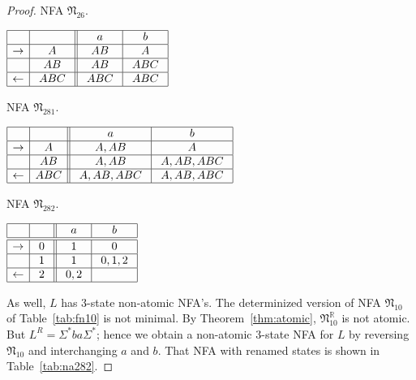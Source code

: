 \documentclass{llncs}
\newcommand{\Sig}{\Sigma}
\newcommand{\fN}{{\mathfrak N}}
\newcommand{\rev}{\mathbb{R}}
\begin{document}
\begin{example}
\begin{proof}
\begin{table}[h]
\begin{minipage}[b]{0.45\linewidth}
\caption{NFA $\fN_{26}$.}
\label{tab:fn26}
\begin{center}
$
\begin{array}{|c| c||c| c| }    
\hline
& \ \  \ \ 
&\ \ a \ \ &\ \ b \ \ \\
\hline  
\rightarrow &A
& \ AB \ & \ A \ \\
\hline  
 & AB
&  AB  & \  ABC \ \\
\hline  
\leftarrow & \ ABC \
 & \ ABC \ & \ ABC \ \\
\hline  
\end{array}
$
\end{center}
\end{minipage}
\hspace{0.2cm}
\begin{minipage}[b]{0.45\linewidth}
\caption{NFA $\fN_{281}$.}
\label{tab:fn281}
\begin{center}
$
\begin{array}{|c| c||c| c| c|c|}    
\hline
& \ \  \ \ 
&\ \ a \ \ &\ \ b \ \   \\
\hline  
\rightarrow & \ A \
&  \ A,AB \  &  \ A  \   \\
\hline  
 & AB
&  \  A,AB \  & \ A,AB,ABC \ \\
\hline  
\leftarrow & ABC
&   \ A,AB,ABC \  &   A,AB,ABC   \\
\hline  
\end{array}
$
\end{center}
\end{minipage}
\end{table}
\begin{table}[htb]
\caption{NFA $\fN_{282}$.}
\label{tab:na282}
\begin{center}
$
\begin{array}{|c|c|| c|c|}    
\hline
 & & \  a \
& \ b \  \\
\hline
\hline
\rightarrow & 0 
& 1 & 0  \\
\hline  
 & 1 
 & 1 & \  0,1,2 \ \\
\hline  
\leftarrow & \ 2 \ 
& \ 0,2 \ &  \\
\hline  
\end{array}
$
\end{center}
\end{table}

As well, $L$ has 3-state non-atomic NFA's.
The determinized version of NFA $\fN_{10}$ of Table~\ref{tab:fn10} is not minimal.
By Theorem~\ref{thm:atomic}, $\fN_{10}^\rev$ is not atomic. But $L^R=\Sig^*ba\Sig^*$;
hence we obtain a non-atomic 3-state NFA for $L$ by reversing $\fN_{10}$ and interchanging $a$ and $b$.
That NFA with renamed states is shown in Table~\ref{tab:na282}.


\end{proof}
\end{example}
\end{document}
